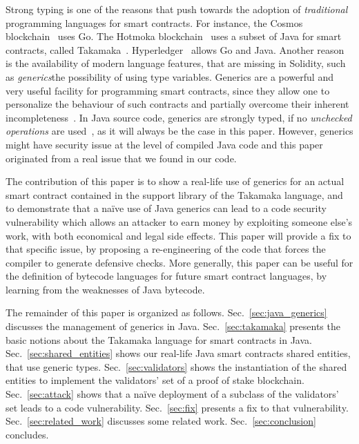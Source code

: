 Strong typing is one of the reasons that push towards the adoption
of \emph{traditional} programming languages for smart contracts. For instance,
the Cosmos blockchain~\cite{cosmos} uses Go. The
Hotmoka blockchain~\cite{hotmoka} uses a subset of Java
for smart contracts, called Takamaka~\cite{Spoto19,Spoto20}.
Hyperledger~\cite{hyperldeger} allows Go and Java.
Another reason is the availability of modern
language features, that are missing in Solidity,
such as \emph{generics}\ie the possibility of using
type variables. Generics are a powerful and very useful facility for programming
smart contracts, since they allow one to personalize the behaviour of such contracts and partially overcome their inherent incompleteness~\cite{ebp}. In Java source code, generics are strongly typed, if no \emph{unchecked operations}
are used~\cite{NaftalinW06}, as it will always be the case in this paper.
However, generics might have security issue at the level of compiled Java code and this paper originated from a
real issue that we found in our code.




The contribution of this paper is to show a real-life
use of generics for an actual smart contract contained in the support
library of the Takamaka language, and to demonstrate that a na\"{i}ve use
of Java generics can lead to a code security vulnerability which
allows an attacker to earn money by exploiting someone else's work, with both economical and legal side effects.
This paper will provide a fix to that specific issue,
by proposing a re-engineering of the code that forces the compiler to generate defensive checks.
More generally, this paper can be useful for the definition of
bytecode languages for future smart contract languages, by
learning from the weaknesses of Java bytecode.

The remainder of this paper is organized as follows.
Sec.~\ref{sec:java_generics} discusses the management of generics in Java.
Sec.~\ref{sec:takamaka} presents the basic notions about the Takamaka language for smart contracts in Java.
Sec.~\ref{sec:shared_entities} shows our real-life Java smart
contracts shared entities, that use generic types.
Sec.~\ref{sec:validators} shows the instantiation of the shared entities to implement the validators' set
of a proof of stake blockchain.
Sec.~\ref{sec:attack} shows that a na\"{i}ve
deployment of a subclass of the validators' set leads to a code vulnerability.
Sec.~\ref{sec:fix} presents a fix to that vulnerability.
Sec.~\ref{sec:related_work} discusses some related work.
Sec.~\ref{sec:conclusion} concludes.


